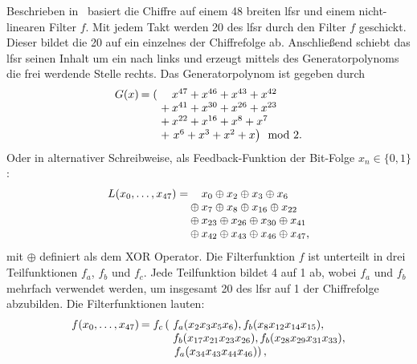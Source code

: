 Beschrieben in~\cite{Verdult2015} basiert die Chiffre auf einem \SI{48}{\bit} breiten \gls{lfsr} und einem nicht-linearen Filter \(f\). Mit jedem Takt werden \SI{20}{\bit} des \gls{lfsr} durch den Filter \(f\) geschickt. Dieser bildet die \SI{20}{\bit} auf ein einzelnes \si{\bit} der Chiffrefolge ab. Anschließend schiebt das \gls{lfsr} seinen Inhalt um ein \si{\bit} nach links und erzeugt mittels des Generatorpolynoms die frei werdende \si{\bit} Stelle rechts. Das Generatorpolynom ist gegeben durch
%
\begin{equation*}
    \setlength\arraycolsep{1pt}
    \begin{array}{c r r l}
        G(x) & = \left( \right. &   & x^{47} + x^{46} + x^{43} + x^{42}                      \\  %
             &                  & + & x^{41} + x^{30} + x^{26} + x^{23}                      \\
             &                  & + & x^{22} + x^{16} + x^{8} + x^{7}                        \\
             &                  & + & {\left. x^{6} + x^{3} + x^{2} + x \right)} \mod{2} {.} %
    \end{array}
\end{equation*}
%
Oder in alternativer Schreibweise, als Feedback-Funktion der Bit-Folge \(x_{n} \in {\{0, 1\}}\):
%
\begin{equation*}
    \setlength\arraycolsep{1pt}
    \begin{array}{r r l}
        L(x_{0}, \dots, x_{47}) = &        & x_{0} \oplus x_{2} \oplus x_{3} \oplus x_{6}         \\
                                  & \oplus & x_{7} \oplus x_{8} \oplus x_{16} \oplus x_{22}       \\
                                  & \oplus & x_{23} \oplus x_{26} \oplus x_{30} \oplus x_{41}     \\
                                  & \oplus & x_{42} \oplus x_{43} \oplus x_{46} \oplus x_{47} {,}
    \end{array}
\end{equation*}
%
mit \(\oplus \) definiert als dem \foreignlanguage{english}{XOR} Operator. Die Filterfunktion \(f\) ist unterteilt in drei Teilfunktionen \(f_{a}\), \(f_{b}\) und \(f_{c}\). Jede Teilfunktion bildet \SI{4}{\bit} auf \SI{1}{\bit} ab, wobei \(f_{a}\) und \(f_{b}\) mehrfach verwendet werden, um insgesamt \SI{20}{\bit} des \gls{lfsr} auf \SI{1}{\bit} der Chiffrefolge abzubilden. Die Filterfunktionen lauten:
%
\begin{equation*}
    \setlength\arraycolsep{1pt}
    \begin{array}{c r l}
        f(x_{0}, \dots, x_{47}) & =  f_{c} \left( \right. & f_{a}(x_{2} x_{3} x_{5} x_{6}), f_{b}(x_{8} x_{12} x_{14} x_{15}),      \\ %
                                &                         & f_{b}(x_{17} x_{21} x_{23} x_{26}), f_{b}(x_{28} x_{29} x_{31} x_{33}), \\
                                &                         & \left. f_{a}(x_{34} x_{43} x_{44} x_{46}) \right) {,}
    \end{array}
\end{equation*}
